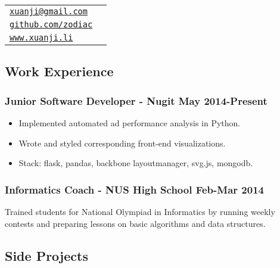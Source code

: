 \documentclass[letterpaper]{article}
\def\name{Li Xuanji}
\begin{document}
\vspace{0.25in}

\begin{minipage}{0.8\linewidth}
\resizebox{0.5\linewidth}{!}{\fontsize{30}{36}\selectfont \name}
\end{minipage}
\begin{minipage}{0.2\linewidth}
  \begin{tabular}{ll}
    \href{mailto:xuanji@gmail.com}{\tt xuanji@gmail.com} \\
    \href{https://github.com/zodiac}{\tt github.com/zodiac} \\
    \href{www.xuanji.li}{\tt www.xuanji.li}
  \end{tabular}
\end{minipage}

\vspace{2em}

\begin{center}
\section*{Work Experience}
\end{center}

\subsubsection*{Junior Software Developer - Nugit \hfill May 2014-Present}
\begin{itemize}
\item Implemented automated ad performance analysis in Python. 
\item Wrote and styled corresponding front-end visualizations. 
\item Stack: flask, pandas, backbone layoutmanager, svg.js, mongodb.
\end{itemize}

\subsubsection*{Informatics Coach - NUS High School \hfill Feb-Mar 2014}
Trained students for National Olympiad in Informatics by running weekly contests and preparing lessons on basic algorithms and data structures.

\vspace{1em}

\begin{center}
\section*{Side Projects}
\end{center}
\end{document}
